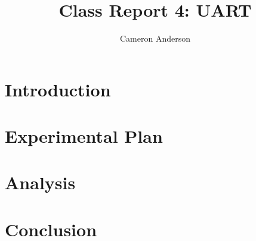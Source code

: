 \documentclass{article}
\author{Cameron Anderson}
\title{Class Report 4: UART}
\begin{document}
\maketitle

\section{Introduction}



\section{Experimental Plan}



\section{Analysis}

%

\section{Conclusion}
\end{document}
